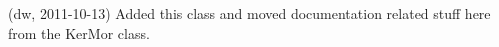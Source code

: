 
\begin{DoxyRefList}
\item[\label{newfeat1_2__newfeat1_2000001}%
\Hypertarget{newfeat1_2__newfeat1_2000001}%
Class \hyperlink{class_matlab_doc_maker}{Matlab\+Doc\+Maker} ](dw, 2011-\/10-\/13) Added this class and moved documentation related stuff here from the Ker\+Mor class.
\end{DoxyRefList}